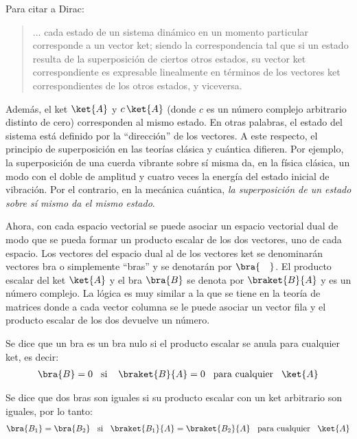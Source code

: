 Para citar a Dirac:
\begin{quote}
... cada estado de un sistema dinámico en un momento particular corresponde a un vector ket; siendo la correspondencia tal que si un estado resulta de la superposición de ciertos otros estados, su vector ket correspondiente es expresable linealmente en términos de los vectores ket correspondientes de los otros estados, y viceversa.
\end{quote}

Además, el ket $\ket{A}$ y $c \, \ket{A}$ (donde $c$ es un número complejo arbitrario distinto de cero) corresponden al mismo estado. En otras palabras, el estado del sistema está definido por la \enquote{dirección} de los vectores. A este respecto, el principio de superposición en las teorías clásica y cuántica difieren. Por ejemplo, la superposición de una cuerda vibrante sobre sí misma da, en la física clásica, un modo con el doble de amplitud y cuatro veces la energía del estado inicial de vibración. Por el contrario, en la mecánica cuántica, \emph{la superposición de un estado sobre sí mismo da el mismo estado}.
\par
Ahora, con cada espacio vectorial se puede asociar un espacio vectorial dual de modo que se pueda formar un producto escalar de los dos vectores, uno de cada espacio. Los vectores del espacio dual al de los vectores ket se denominarán vectores bra o simplemente \enquote{bras} y se denotarán por $\bra{ \quad }$. El producto escalar del ket $\ket{A}$ y el bra $\bra{B}$ se denota por $\braket{B}{A}$ y es un número complejo. La lógica es muy similar a la que se tiene en la teoría de matrices donde a cada vector columna se le puede asociar un vector fila y el producto escalar de los dos devuelve un número.
\par
Se dice que un bra es un bra nulo si el producto escalar se anula para cualquier ket, es decir:
\begin{align}
\bra{B} = 0 \hspace{0.3cm} \mbox{si} \hspace{0.4cm} \braket{B}{A} = 0 \hspace{0.3cm} \mbox{para cualquier} \hspace{0.3cm} \ket{A}
\label{eq:ecuacion_02}
\end{align}

Se dice que dos bras son iguales si su producto escalar con un ket arbitrario son iguales, por lo tanto:
\begin{align}
\bra{B_{1}} = \bra{B_{2}} \hspace{0.3cm} \mbox{si} \hspace{0.3cm} \braket{B_{1}}{A} = \braket{B_{2}}{A} \hspace{0.3cm} \mbox{para cualquier} \hspace{0.3cm} \ket{A}
\label{eq:ecuacion_03}
\end{align}

